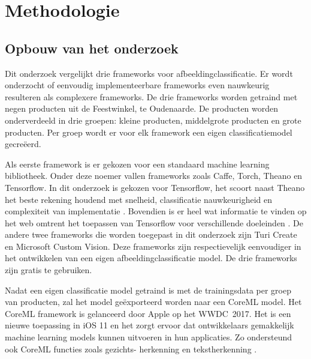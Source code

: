 
\chapter{Methodologie}
\label{ch:methodologie}


\section{Opbouw van het onderzoek}
\label{sec:Opbouw van het onderzoek}

Dit onderzoek vergelijkt drie frameworks voor afbeeldingclassificatie. Er wordt onderzocht of eenvoudig implementeerbare frameworks even nauwkeurig resulteren als complexere frameworks. De drie frameworks worden getraind met negen producten uit de Feestwinkel, te Oudenaarde. De producten worden onderverdeeld in drie groepen: kleine producten, middelgrote producten en grote producten. Per groep wordt er voor elk framework een eigen classificatiemodel gecreëerd.

Als eerste framework is er gekozen voor een standaard machine learning bibliotheek. Onder deze noemer vallen frameworks zoals Caffe, Torch, Theano en Tensorflow. In dit onderzoek is gekozen voor Tensorflow, het scoort naast Theano het beste rekening houdend met snelheid, classificatie nauwkeurigheid en complexiteit van implementatie \autocite{Deeplearning}. Bovendien is er heel wat informatie te vinden op het web omtrent het toepassen van Tensorflow voor verschillende doeleinden \autocite{huyen}. De andere twee frameworks die worden toegepast in dit onderzoek zijn Turi Create en Microsoft Custom Vision. Deze frameworks zijn respectievelijk eenvoudiger in het ontwikkelen van een eigen afbeeldingclassificatie model. De drie frameworks zijn gratis te gebruiken. 

Nadat een eigen classificatie model getraind is met de trainingsdata per groep van producten, zal het model geëxporteerd worden naar een CoreML model. Het CoreML framework is gelanceerd door Apple op het \acrshort{WWDC} 2017. Het is een nieuwe toepassing in iOS 11 en het zorgt ervoor dat ontwikkelaars gemakkelijk machine learning models kunnen uitvoeren in hun applicaties. Zo ondersteund ook CoreML functies zoals gezichts- herkenning en tekstherkenning \autocite{coreml}. 

